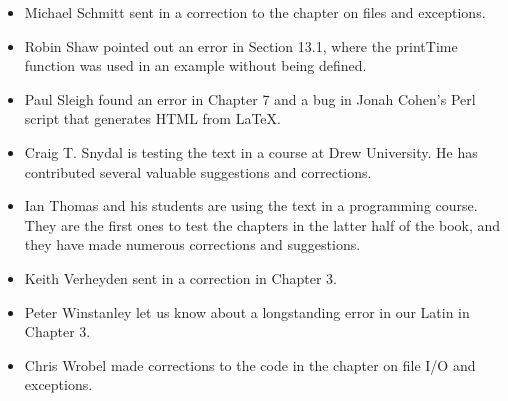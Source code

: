 \begin{itemize}

\item Michael Schmitt sent in a correction to the chapter on files
and exceptions.


\item Robin Shaw pointed out an error in Section 13.1, where the
printTime function was used in an example without being defined.


\item Paul Sleigh found an error in Chapter 7 and a bug in Jonah Cohen's
Perl script that generates HTML from LaTeX.




\item Craig T. Snydal is testing the text in a course at Drew
University.  He has contributed several valuable suggestions and corrections.


\item Ian Thomas and his students are using the text in a programming
course.  They are the first ones to test the chapters in the latter half
of the book, and they have made numerous corrections and suggestions.


\item Keith Verheyden sent in a correction in Chapter 3.


\item Peter Winstanley let us know about a longstanding error in
our Latin in Chapter 3.


\item Chris Wrobel made corrections to the code in the chapter on
file I/O and exceptions. 


\end{itemize}
